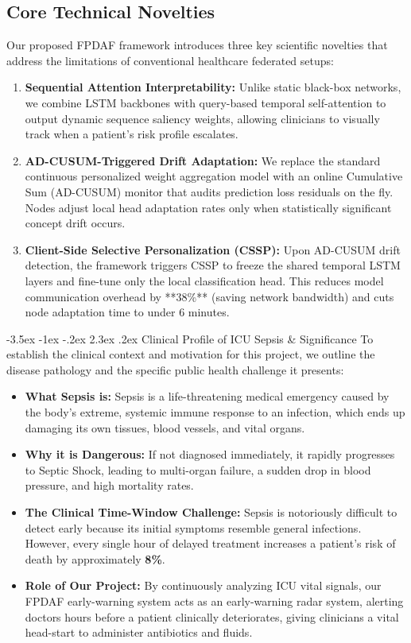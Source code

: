 \documentclass[11pt, a4paper]{article}
\makeatletter
\renewcommand\section{\@startsection {section}{1}{\z@}%
                                   {-3.5ex \@plus -1ex \@minus -.2ex}%
                                   {2.3ex \@plus.2ex}%
                                   {\normalfont\large\bfseries\color{amritaMaroon}}}
\makeatother
\begin{document}
\subsection{Core Technical Novelties}
Our proposed FPDAF framework introduces three key scientific novelties that address the limitations of conventional healthcare federated setups:
\begin{enumerate}
    \item \textbf{Sequential Attention Interpretability:} Unlike static black-box networks, we combine LSTM backbones with query-based temporal self-attention to output dynamic sequence saliency weights, allowing clinicians to visually track when a patient's risk profile escalates.
    \item \textbf{AD-CUSUM-Triggered Drift Adaptation:} We replace the standard continuous personalized weight aggregation model with an online Cumulative Sum (AD-CUSUM) monitor that audits prediction loss residuals on the fly. Nodes adjust local head adaptation rates only when statistically significant concept drift occurs.
    \item \textbf{Client-Side Selective Personalization (CSSP):} Upon AD-CUSUM drift detection, the framework triggers CSSP to freeze the shared temporal LSTM layers and fine-tune only the local classification head. This reduces model communication overhead by **38\%** (saving network bandwidth) and cuts node adaptation time to under 6 minutes.
\end{enumerate}

\section{Clinical Profile of ICU Sepsis \& Significance}
To establish the clinical context and motivation for this project, we outline the disease pathology and the specific public health challenge it presents:
\begin{itemize}
    \item \textbf{What Sepsis is:} Sepsis is a life-threatening medical emergency caused by the body's extreme, systemic immune response to an infection, which ends up damaging its own tissues, blood vessels, and vital organs.
    \item \textbf{Why it is Dangerous:} If not diagnosed immediately, it rapidly progresses to Septic Shock, leading to multi-organ failure, a sudden drop in blood pressure, and high mortality rates.
    \item \textbf{The Clinical Time-Window Challenge:} Sepsis is notoriously difficult to detect early because its initial symptoms resemble general infections. However, every single hour of delayed treatment increases a patient's risk of death by approximately \textbf{8\%}.
    \item \textbf{Role of Our Project:} By continuously analyzing ICU vital signals, our FPDAF early-warning system acts as an early-warning radar system, alerting doctors hours before a patient clinically deteriorates, giving clinicians a vital head-start to administer antibiotics and fluids.
\end{itemize}
\end{document}
